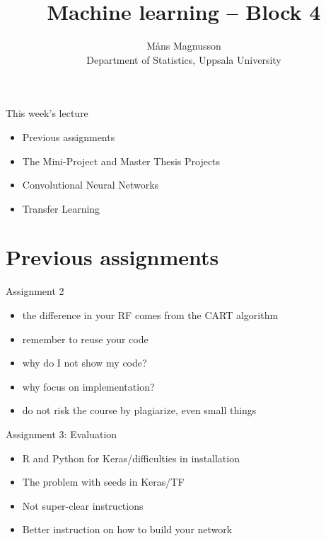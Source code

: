 \documentclass[10pt]{beamer}
\title[]{{\color{black}Machine learning -- Block 4}}
\author[]{M{\aa}ns Magnusson\\Department of Statistics, Uppsala University}
\date{\currentsemester}
\begin{document}
\frame{\titlepage
}



\begin{frame}{This week's lecture}
\begin{itemize}
\item Previous assignments
\item The Mini-Project and Master Thesis Projects
\item Convolutional Neural Networks
\item Transfer Learning
\end{itemize}
\end{frame}




\section{Previous assignments}

\begin{frame}{Assignment 2}

\begin{itemize}
\item the difference in your RF comes from the CART algorithm
\item remember to reuse your code
\item why do I not show my code?
\item why focus on implementation?
\item do not risk the course by plagiarize, even small things
\end{itemize}

\end{frame}

\begin{frame}{Assignment 3: Evaluation}

\begin{itemize}
\item R and Python for Keras/difficulties in installation
\item The problem with seeds in Keras/TF
\item Not super-clear instructions
\item Better instruction on how to build your network
\end{itemize}

\end{frame}
\end{document}

